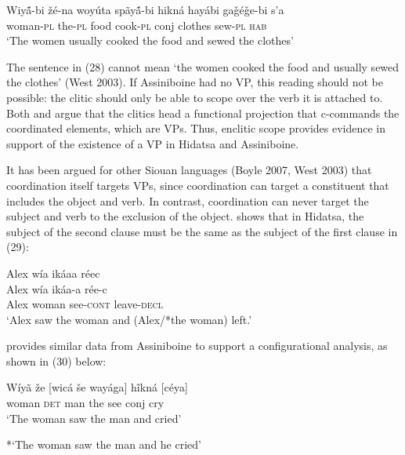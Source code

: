 \documentclass[output=paper]{LSP/langsci}
\begin{document}
\begin{exe}
\ex \gll Wiy\'{\~a}-bi 		\v{z}\'e-na 	woy\'uta 	sp\~ay\'{\~a}-bi 	hikn\'a 	hay\'abi 		ga\v{g}\'e\v{g}e-bi 	s'a \\
woman-\textsc{pl} the-\textsc{pl} 	food 	cook-\textsc{pl} 	conj 	clothes 	sew-\textsc{pl} 	\textsc{hab} \\
\trans `The women usually cooked the food and sewed the clothes' \citep[39]{West2003}
\end{exe}

The sentence in (28) cannot mean `the women cooked the food and usually sewed the clothes' (West 2003).  If Assiniboine had no VP, this reading should not be possible: the clitic should only be able to scope over the verb it is attached to. Both \citet{Boyle2007} and \citet{West2003} argue that the clitics head a functional projection that c-commands the coordinated elements, which are VPs.  Thus, enclitic scope provides evidence in support of the existence of a VP in Hidatsa and Assiniboine.
	
It has been argued for other Siouan languages (Boyle 2007, West 2003) that coordination itself targets VPs, since coordination can target a constituent that includes the object and verb. In contrast, coordination can never target the subject and verb to the exclusion of the object.  \citet{Boyle2007} shows that in Hidatsa, the subject of the second clause must be the same as the subject of the first clause in (29):

\begin{exe}
\ex 
\glll Alex w\'ia ik\'aaa r\'eec\\
Alex w\'ia ik\'aa-a r\'ee-c \\
Alex woman see-\textsc{cont} leave-\textsc{decl} \\
\trans `Alex saw the woman and (Alex/*the woman) left.' \citep[217]{Boyle2007} 
\end{exe}

\citet{West2003} provides similar data from Assiniboine to support a configurational analysis, as shown in (30) below:

\begin{exe}
\ex \gll W\'iy\~a 	 \v{z}e 		[wic\'a 	\v{s}e 	way\'aga] h\~ikn\'a 	[c\'eya] \\
woman 	\textsc{det} 	man 		the see 				conj 		cry \\
\trans `The woman saw the man and cried'

*`The woman saw the man and he cried' \citep[34]{West2003}
\end{exe}
\end{document}
